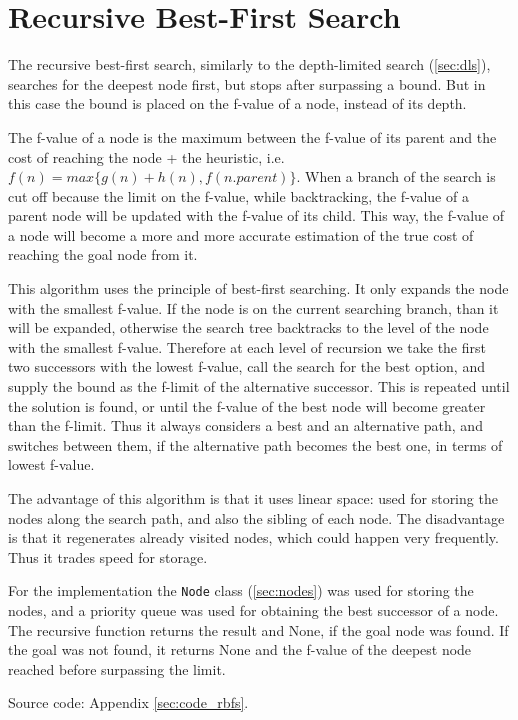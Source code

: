 \chapter{Recursive Best-First Search} 

The recursive best-first search, similarly to the depth-limited search (\ref{sec:dls}), searches for the deepest node first, but stops after surpassing a bound. But in this case the bound is placed on the f-value of a node, instead of its depth.

The f-value of a node is the maximum between the f-value of its parent and the cost of reaching the node + the heuristic, i.e. $f(n) = max\{ g(n) + h(n), f(n.parent) \}$. When a branch of the search is cut off because the limit on the f-value, while backtracking, the f-value of a parent node will be updated with the f-value of its child. This way, the f-value of a node will become a more and more accurate estimation of the true cost of reaching the goal node from it.

This algorithm uses the principle of best-first searching. It only expands the node with the smallest f-value. If the node is on the current searching branch, than it will be expanded, otherwise the search tree backtracks to the level of the node with the smallest f-value. Therefore at each level of recursion we take the first two successors with the lowest f-value, call the search for the best option, and supply the bound as the f-limit of the alternative successor. This is repeated until the solution is found, or until the f-value of the best node will become greater than the f-limit. Thus it always considers a best and an alternative path, and switches between them, if the alternative path becomes the best one, in terms of lowest f-value.

The advantage of this algorithm is that it uses linear space: used for storing the nodes along the search path, and also the sibling of each node. The disadvantage is that it regenerates already visited nodes, which could happen very frequently. Thus it trades speed for storage.

For the implementation the \verb|Node| class (\ref{sec:nodes}) was used for storing the nodes, and a priority queue was used for obtaining the best successor of a node. The recursive function returns the result and None, if the goal node was found. If the goal was not found, it returns None and the f-value of the deepest node reached before surpassing the limit.

Source code: Appendix \ref{sec:code_rbfs}.

